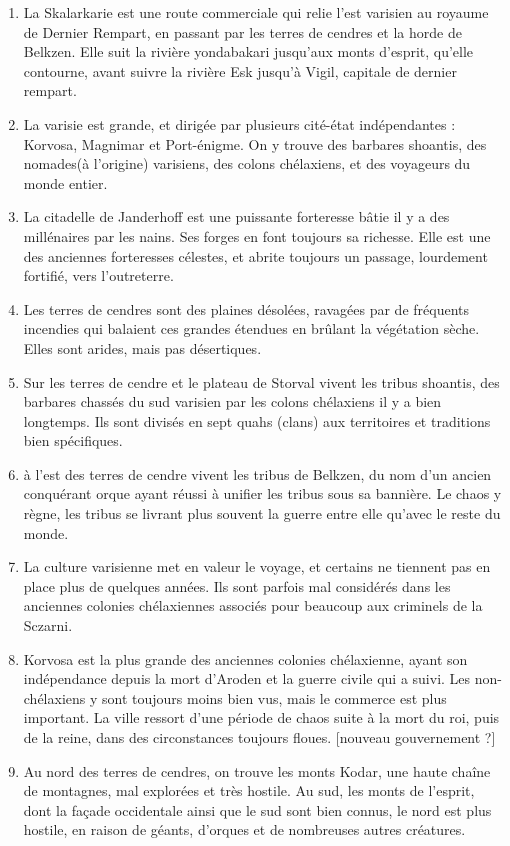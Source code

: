 \documentclass[letterpaper,10pt,twoside,twocolumn,openany]{book}
\begin{document}
\begin{enumerate}
    \item La Skalarkarie est une route commerciale qui relie l'est varisien au royaume de Dernier Rempart, en passant par les terres de cendres et la horde de Belkzen. Elle suit la rivière yondabakari jusqu'aux monts d'esprit, qu'elle contourne, avant suivre la rivière Esk jusqu'à Vigil, capitale de dernier rempart.
    \item La varisie est grande, et dirigée par plusieurs cité-état indépendantes : Korvosa, Magnimar et Port-énigme. On y trouve des barbares shoantis, des nomades(à l'origine) varisiens, des colons chélaxiens, et des voyageurs du monde entier.
    \item La citadelle de Janderhoff est une puissante forteresse bâtie il y a des millénaires par les nains. Ses forges en font toujours sa richesse. Elle est une des anciennes forteresses célestes, et abrite toujours un passage, lourdement fortifié, vers l'outreterre.
    \item Les terres de cendres sont des plaines désolées, ravagées par de fréquents incendies qui balaient ces grandes étendues en brûlant la végétation sèche. Elles sont arides, mais pas désertiques. 
    \item Sur les terres de cendre et le plateau de Storval vivent les tribus shoantis, des barbares chassés du sud varisien par les colons chélaxiens il y a bien longtemps. Ils sont divisés en sept quahs (clans) aux territoires et traditions bien spécifiques.
    \item à l'est des terres de cendre vivent les tribus de Belkzen, du nom d'un ancien conquérant orque ayant réussi à unifier les tribus sous sa bannière. Le chaos y règne, les tribus se livrant plus souvent la guerre entre elle qu'avec le reste du monde.
    \item La culture varisienne met en valeur le voyage, et certains ne tiennent pas en place plus de quelques années. Ils sont parfois mal considérés dans les anciennes colonies chélaxiennes associés pour beaucoup aux criminels de la Sczarni.
    \item Korvosa est la plus grande des anciennes colonies chélaxienne, ayant son indépendance depuis la mort d'Aroden et la guerre civile qui a suivi. Les non-chélaxiens y sont toujours moins bien vus, mais le commerce est plus important. La ville ressort d'une période de chaos suite à la mort du roi, puis de la reine, dans des circonstances toujours floues. [nouveau gouvernement ?]
    \item Au nord des terres de cendres, on trouve les monts Kodar, une haute chaîne de montagnes, mal explorées et très hostile. Au sud, les monts de l'esprit, dont la façade occidentale ainsi que le sud sont bien connus, le nord est plus hostile, en raison de géants, d'orques et de nombreuses autres créatures.

\end{enumerate}
\end{document}
